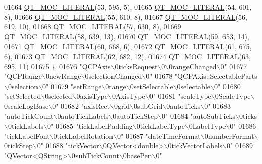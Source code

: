 \begin{DoxyCode}
01664 \hyperlink{a00016_a75bb9482d242cde0a06c9dbdc6b83abe}{QT\_MOC\_LITERAL}(53, 595, 5),
01665 \hyperlink{a00016_a75bb9482d242cde0a06c9dbdc6b83abe}{QT\_MOC\_LITERAL}(54, 601, 8),
01666 \hyperlink{a00016_a75bb9482d242cde0a06c9dbdc6b83abe}{QT\_MOC\_LITERAL}(55, 610, 8),
01667 \hyperlink{a00016_a75bb9482d242cde0a06c9dbdc6b83abe}{QT\_MOC\_LITERAL}(56, 619, 10),
01668 \hyperlink{a00016_a75bb9482d242cde0a06c9dbdc6b83abe}{QT\_MOC\_LITERAL}(57, 630, 8),
01669 \hyperlink{a00016_a75bb9482d242cde0a06c9dbdc6b83abe}{QT\_MOC\_LITERAL}(58, 639, 13),
01670 \hyperlink{a00016_a75bb9482d242cde0a06c9dbdc6b83abe}{QT\_MOC\_LITERAL}(59, 653, 14),
01671 \hyperlink{a00016_a75bb9482d242cde0a06c9dbdc6b83abe}{QT\_MOC\_LITERAL}(60, 668, 6),
01672 \hyperlink{a00016_a75bb9482d242cde0a06c9dbdc6b83abe}{QT\_MOC\_LITERAL}(61, 675, 6),
01673 \hyperlink{a00016_a75bb9482d242cde0a06c9dbdc6b83abe}{QT\_MOC\_LITERAL}(62, 682, 12),
01674 \hyperlink{a00016_a75bb9482d242cde0a06c9dbdc6b83abe}{QT\_MOC\_LITERAL}(63, 695, 11)
01675     \},
01676     \textcolor{stringliteral}{"QCPAxis\(\backslash\)0ticksRequest\(\backslash\)0\(\backslash\)0rangeChanged\(\backslash\)0"}
01677     \textcolor{stringliteral}{"QCPRange\(\backslash\)0newRange\(\backslash\)0selectionChanged\(\backslash\)0"}
01678     \textcolor{stringliteral}{"QCPAxis::SelectableParts\(\backslash\)0selection\(\backslash\)0"}
01679     \textcolor{stringliteral}{"setRange\(\backslash\)0range\(\backslash\)0setSelectable\(\backslash\)0selectable\(\backslash\)0"}
01680     \textcolor{stringliteral}{"setSelected\(\backslash\)0selected\(\backslash\)0axisType\(\backslash\)0AxisType\(\backslash\)0"}
01681     \textcolor{stringliteral}{"scaleType\(\backslash\)0ScaleType\(\backslash\)0scaleLogBase\(\backslash\)0"}
01682     \textcolor{stringliteral}{"axisRect\(\backslash\)0grid\(\backslash\)0subGrid\(\backslash\)0autoTicks\(\backslash\)0"}
01683     \textcolor{stringliteral}{"autoTickCount\(\backslash\)0autoTickLabels\(\backslash\)0autoTickStep\(\backslash\)0"}
01684     \textcolor{stringliteral}{"autoSubTicks\(\backslash\)0ticks\(\backslash\)0tickLabels\(\backslash\)0"}
01685     \textcolor{stringliteral}{"tickLabelPadding\(\backslash\)0tickLabelType\(\backslash\)0LabelType\(\backslash\)0"}
01686     \textcolor{stringliteral}{"tickLabelFont\(\backslash\)0tickLabelRotation\(\backslash\)0"}
01687     \textcolor{stringliteral}{"dateTimeFormat\(\backslash\)0numberFormat\(\backslash\)0tickStep\(\backslash\)0"}
01688     \textcolor{stringliteral}{"tickVector\(\backslash\)0QVector<double>\(\backslash\)0tickVectorLabels\(\backslash\)0"}
01689     \textcolor{stringliteral}{"QVector<QString>\(\backslash\)0subTickCount\(\backslash\)0basePen\(\backslash\)0"}

\end{DoxyCode}
